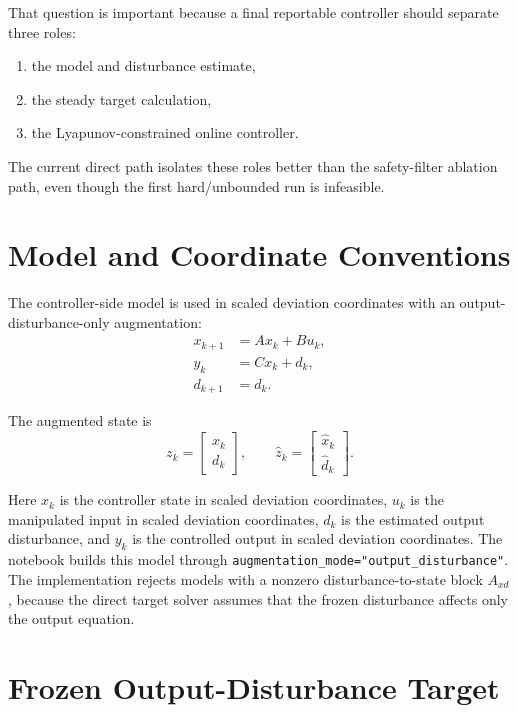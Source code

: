 \documentclass[11pt]{article}
\begin{document}
That question is important because a final reportable controller should separate
three roles:
\begin{enumerate}[leftmargin=1.5em]
\item the model and disturbance estimate,
\item the steady target calculation,
\item the Lyapunov-constrained online controller.
\end{enumerate}
The current direct path isolates these roles better than the safety-filter
ablation path, even though the first hard/unbounded run is infeasible.

\section{Model and Coordinate Conventions}

The controller-side model is used in scaled deviation coordinates with an
output-disturbance-only augmentation:
\begin{align}
x_{k+1} &= A x_k + B u_k, \\
y_k &= Cx_k + d_k, \\
d_{k+1} &= d_k.
\end{align}

The augmented state is
\begin{equation}
z_k =
\begin{bmatrix}
x_k \\
d_k
\end{bmatrix},
\qquad
\hat z_k =
\begin{bmatrix}
\hat x_k \\
\hat d_k
\end{bmatrix}.
\end{equation}

Here \(x_k\) is the controller state in scaled deviation coordinates, \(u_k\) is
the manipulated input in scaled deviation coordinates, \(d_k\) is the estimated
output disturbance, and \(y_k\) is the controlled output in scaled deviation
coordinates. The notebook builds this model through
\texttt{augmentation\_mode="output\_disturbance"}. The implementation rejects
models with a nonzero disturbance-to-state block \(A_{xd}\), because the direct
target solver assumes that the frozen disturbance affects only the output
equation.

\section{Frozen Output-Disturbance Target}
\end{document}
